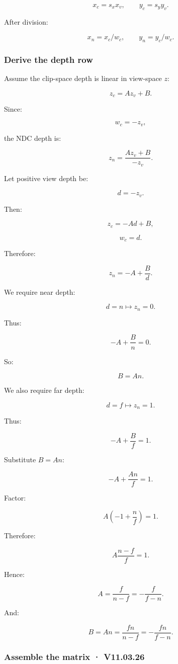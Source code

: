\[
 x_c=s_xx_v, \qquad y_c=s_yy_v.
\]

After division:

\[
 x_n=x_c/w_c, \qquad y_n=y_c/w_c.
\]

\subsubsection{Derive the depth row}\label{derive-the-depth-row}

Assume the clip-space depth is linear in view-space \(z\):

\[
 \boxed{ z_c=Az_v+B }.
\]

Since:

\[
 w_c=-z_v,
\]

the NDC depth is:

\[
 z_n= \frac{Az_v+B}{-z_v}.
\]

Let positive view depth be:

\[
 d=-z_v.
\]

Then:

\[
 z_c=-Ad+B,
\]

\[
 w_c=d.
\]

Therefore:

\[
 \boxed{ z_n=-A+\frac Bd }.
\]

We require near depth:

\[
 d=n\longmapsto z_n=0.
\]

Thus:

\[
 -A+\frac Bn=0.
\]

So:

\[
 \boxed{B=An}.
\]

We also require far depth:

\[
 d=f\longmapsto z_n=1.
\]

Thus:

\[
 -A+\frac Bf=1.
\]

Substitute \(B=An\):

\[
 -A+\frac{An}{f}=1.
\]

Factor:

\[
 A\left(-1+\frac nf\right)=1.
\]

Therefore:

\[
 A\frac{n-f}{f}=1.
\]

Hence:

\[
 \boxed{ A=\frac f{n-f} =-\frac f{f-n} }.
\]

And:

\[
 \boxed{ B=An= \frac{fn}{n-f} =-\frac{fn}{f-n} }.
\]

\subsubsection{Assemble the matrix · V11.03.26}\label{assemble-the-matrix-v11.03.26}


